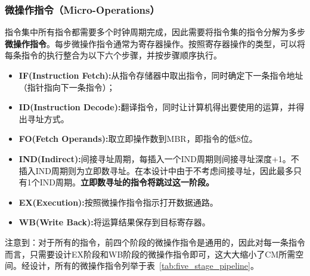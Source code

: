 \documentclass[lang=cn,a4paper,newtx]{elegantpaper}
\begin{document}
\subsubsection{微操作指令（Micro-Operations）}\label{sec:cu:micro}
指令集中所有指令都需要多个时钟周期完成，因此需要将指令集的指令分解为多步\textbf{微操作指令}。每步微操作指令通常为寄存器操作。按照寄存器操作的类型，可以将每条指令的执行整合为以下六个步骤，并按步骤顺序执行。
\begin{itemize}
  \item \textbf{IF(Instruction Fetch):}从指令存储器中取出指令，同时确定下一条指令地址（指针指向下一条指令）；
  \item \textbf{ID(Instruction Decode):}翻译指令，同时让计算机得出要使用的运算，并得出寻址方式。
  \item \textbf{FO(Fetch Operands):}取立即操作数到MBR，即指令的低8位。
  \item \textbf{IND(Indirect):}间接寻址周期，每插入一个IND周期则间接寻址深度+1。不插入IND周期则为立即数寻址。在本设计中由于不考虑间接寻址，因此最多只有1个IND周期。\textbf{立即数寻址的指令将跳过这一阶段。}
  \item \textbf{EX(Execution):}按照微操作指令指示打开数据通路。
  \item \textbf{WB(Write Back):}将运算结果保存到目标寄存器。
\end{itemize}

注意到：对于所有的指令，前四个阶段的微操作指令是通用的，因此对每一条指令而言，只需要设计EX阶段和WB阶段的微操作指令即可，这大大缩小了CM所需空间。经设计，所有的微操作指令列举于表~\ref{tab:five_stage_pipeline}。
\end{document}
